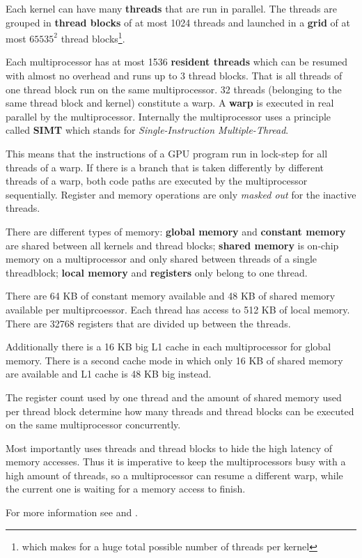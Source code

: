 Each kernel can have many \textbf{threads} that are run in parallel. The threads are grouped in \textbf{thread blocks} of at most 1024 threads and launched in a \textbf{grid} of at most $65535^2$ thread blocks\footnote{which makes for a huge total possible number of threads per kernel}.

Each multiprocessor has at most 1536 \textbf{resident threads} which can be resumed with almost no overhead and runs up to 3 thread blocks. That is all threads of one thread block run on the same multiprocessor. 32 threads (belonging to the same thread block and kernel) constitute a warp. A \textbf{warp} is executed in real parallel by the multiprocessor. Internally the multiprocessor uses a principle called \textbf{SIMT} which stands for \textit{Single-Instruction Multiple-Thread}.

This means that the instructions of a GPU program run in lock-step for all threads of a warp. If there is a branch that is taken differently by different threads of a warp, both code paths are executed by the multiprocessor sequentially. Register and memory operations are only \textit{masked out} for the inactive threads.

There are different types of memory: \textbf{global memory} and \textbf{constant memory} are shared between all kernels and thread blocks; \textbf{shared memory} is on-chip memory on a multiprocessor and only shared between threads of a single threadblock; \textbf{local memory} and \textbf{registers} only belong to one thread.

There are 64 KB of constant memory available and 48 KB of shared memory available per multiprcoessor. Each thread has access to 512 KB of local memory. There are 32768 registers that are divided up between the threads.

Additionally there is a 16 KB big L1 cache in each multiprocessor for global memory. There is a second cache mode in which only 16 KB of shared memory are available and L1 cache is 48 KB big instead.

The register count used by one thread and the amount of shared memory used per thread block determine how many threads and thread blocks can be executed on the same multiprocessor concurrently.

Most importantly \cuda{} uses threads and thread blocks to hide the high latency of memory accesses. Thus it is imperative to keep the multiprocessors busy with a high amount of threads, so a multiprocessor can resume a different warp, while the current one is waiting for a memory access to finish.

For more information see \cite{cuda11progguide} and \cite{cuda11bestpract}.